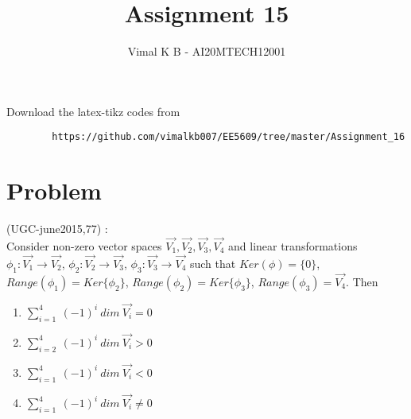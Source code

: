 \documentclass[journal,12pt]{IEEEtran}
\begin{document}
	\renewcommand{\thefigure}{\theproblem}
	\def\putbox#1#2#3{\makebox[0in][l]{\makebox[#1][l]{}\raisebox{\baselineskip}[0in][0in]{\raisebox{#2}[0in][0in]{#3}}}}
	\def\rightbox#1{\makebox[0in][r]{#1}}
	\def\centbox#1{\makebox[0in]{#1}}
	\def\topbox#1{\raisebox{-\baselineskip}[0in][0in]{#1}}
	\def\midbox#1{\raisebox{-0.5\baselineskip}[0in][0in]{#1}}
	\vspace{3cm}
	\title{Assignment 15}
	\author{Vimal K B - AI20MTECH12001}
	\maketitle
	\bigskip
	\renewcommand{\thefigure}{\theenumi}
	\renewcommand{\thetable}{\theenumi}
	Download the latex-tikz codes from 
	\begin{lstlisting}
		https://github.com/vimalkb007/EE5609/tree/master/Assignment_16
	\end{lstlisting}
	\section{\textbf{Problem}}
	(UGC-june2015,77) : \\
	Consider non-zero vector spaces $\vec{V_1}, \vec{V_2}, \vec{V_3}, \vec{V_4}$ and linear transformations $\phi_1 : \vec{V_1} \rightarrow \vec{V_2}$, $\phi_2 : \vec{V_2} \rightarrow \vec{V_3}$, $\phi_3 : \vec{V_3} \rightarrow \vec{V_4}$ such that $Ker(\phi) = \{0\}$, $Range(\phi_1) = Ker\{\phi_2\}$, $Range(\phi_2) = Ker\{\phi_3\}$, $Range(\phi_3) = \vec{V_4}$. Then \\
	
	\begin{enumerate}
		\item $\sum_{i=1}^{4} \ (-1)^{i} \ dim \ \vec{V_i} = 0$ \\
		\item $\sum_{i=2}^{4} \ (-1)^{i} \ dim \ \vec{V_i} > 0$ \\
		\item $\sum_{i=1}^{4} \ (-1)^{i} \ dim \ \vec{V_i} < 0$ \\
		\item $\sum_{i=1}^{4} \ (-1)^{i} \ dim \ \vec{V_i} \neq 0$
	\end{enumerate}
	
	
\end{document}
